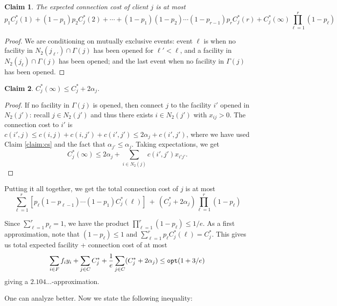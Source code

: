 \documentclass[11pt]{article}
\newtheorem{claim}{Claim}
\def\opt{{\tt opt}}
\begin{document}
\begin{claim}
The expected connection cost of client $j$ is at most
$$p_1C^*_j(1) + (1 - p_1)p_2C^*_j(2) + \cdots+ (1-p_1)(1-p_2)\cdots (1-p_{r-1})p_rC^*_j(r) + C^*_j(\infty)\prod_{\ell=1}^r(1-p_\ell) $$
\end{claim}
\begin{proof}
We are conditioning on mutually exclusive events: event $\ell$ is when no facility in $N_2(j_{\ell'})\cap \Gamma(j)$ has been opened for $\ell' < \ell$, and a facility in $N_2(j_\ell)\cap \Gamma(j)$ has been opened; and
the last event when no facility in $\Gamma(j)$ has been opened.
\end{proof}

\begin{claim}
$C^*_j(\infty) \le C^*_j + 2\alpha_j$.
\end{claim}
\begin{proof}
If no facility in $\Gamma(j)$ is opened, then connect $j$ to the facility $i'$ opened
in $N_2(j')$: recall $j\in N_2(j')$ and thus there exists $i\in N_2(j')$ with $x_{ij} > 0$. 
The connection cost to $i'$ is $ c(i',j) \le c(i,j) + c(i,j') + c(i',j') \le 2\alpha_j  + c(i',j')$,
where we have used Claim \ref{claim:cs} and the fact that $\alpha_{j'} \le \alpha_j$.
Taking expectations, we get
$$C^*_j(\infty) \le 2\alpha_j + \sum_{i\in N_2(j)}c(i',j')x_{i'j'}.$$
\end{proof}

\noindent
Putting it all together, we get the total connection cost of $j$ is at most
\begin{equation}\label{eq:connj}
\sum_{\ell = 1}^r \left[p_\ell (1 - p_{\ell - 1})\cdots (1-p_1)C^*_j(\ell)\right] ~+~ (C^*_j + 2\alpha_j)\prod_{\ell=1}^r(1-p_\ell)
\end{equation}

Since $\sum_{\ell=1}^r p_\ell = 1$, we have the product $\prod_{\ell=1}^r(1-p_\ell) \le 1/e$.
As a first approximation, note that $(1-p_\ell) \le1$ and $\sum_{\ell=1}^r p_\ell C^*_j(\ell) = C^*_j$. This gives us total expected facility + connection cost of at most 
$$\sum_{i\in F} f_iy_i + \sum_{j\in C} C^*_j + \frac{1}{e} \sum_{j\in C}(C^*_j + 2\alpha_j) \le \opt(1+3/e)$$
giving a $2.104...$-approximation.

One can analyze better.
Now we state the following  inequality:
\end{document}
